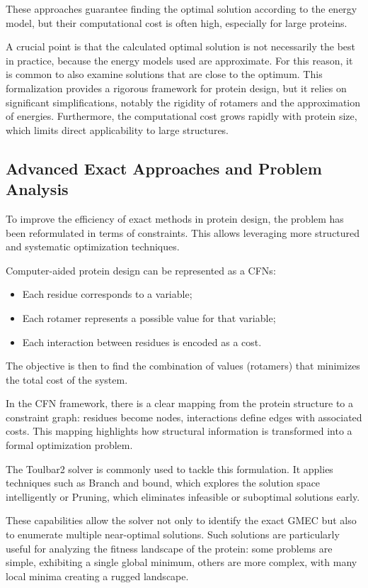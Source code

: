 \documentclass[runningheads]{llncs}
\begin{document}
These approaches guarantee finding the optimal solution according to the energy model, but their computational cost is often high, especially for large proteins.

A crucial point is that the calculated optimal solution is not necessarily the best in practice, because the energy models used are approximate. For this reason, it is common to also examine solutions that are close to the optimum.
This formalization provides a rigorous framework for protein design, but it relies on significant simplifications, notably the rigidity of rotamers and the approximation of energies. Furthermore, the computational cost grows rapidly with protein size, which limits direct applicability to large structures.

\subsection{Advanced Exact Approaches and Problem Analysis}

To improve the efficiency of exact methods in protein design, the problem has been reformulated in terms of constraints. This allows leveraging more structured and systematic optimization techniques.

Computer-aided protein design can be represented as a \ac{CFNs}:

\begin{itemize}
    \item Each residue corresponds to a variable;
    \item Each rotamer represents a possible value for that variable;
    \item Each interaction between residues is encoded as a cost.
\end{itemize}

The objective is then to find the combination of values (rotamers) that minimizes the total cost of the system.

In the CFN framework, there is a clear mapping from the protein structure to a constraint graph: residues become nodes, interactions define edges with associated costs. This mapping highlights how structural information is transformed into a formal optimization problem.

The Toulbar2 solver is commonly used to tackle this formulation. It applies techniques such as Branch and bound, which explores the solution space intelligently or Pruning, which eliminates infeasible or suboptimal solutions early.

These capabilities allow the solver not only to identify the exact \ac{GMEC} but also to enumerate multiple near-optimal solutions. Such solutions are particularly useful for analyzing the fitness landscape of the protein: some problems are simple, exhibiting a single global minimum, others are more complex, with many local minima creating a rugged landscape.
\end{document}

